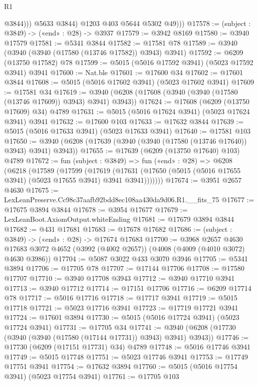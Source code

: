 \begin{lexlean}{R1}
\begin{coremodule}
                  @3844)))
            @5633
            @3844)
          @1203
          @403
          @5644
          @5302
          @49)))
@17578 := (subject : @3849) -> («end» : @28) -> @3937
@17579 := @3942 @8169
@17580 := @3940 @17579
@17581 := @5341 @3844
@17582 := @17581 @78
@17589 := @3940 (@3940 (@3940 (@17580 (@13746 @17582)) @3943) @3941)
@17592 := @6209 (@13750 @17582) @78
@17599 := @5015 (@5016 @17592 @3941) (@5023 @17592 @3941) @3941
@17600 := Nat.ble
@17601 := @17600 @34
@17602 := @17601 @3844
@17608 := @5015 (@5016 @17602 @3941) (@5023 @17602 @3941)
@17609 := @17581 @34
@17619 := @3940 (@6208 (@17608 (@3940 (@3940 (@17580 (@13746 @17609)) @3943) @3941) @3943))
@17624 := @17608 (@6209 (@13750 @17609) @34) @4789
@17631 := @5015 (@5016 @17624 @3941) (@5023 @17624 @3941) @3941
@17632 := @17600 @103
@17633 := @17632 @3844
@17639 := @5015 (@5016 @17633 @3941) (@5023 @17633 @3941)
@17640 := @17581 @103
@17650 := @3940 (@6208 (@17639 (@3940 (@3940 (@17580 (@13746 @17640)) @3943) @3941) @3943))
@17655 := @17639 (@6209 (@13750 @17640) @103) @4789
@17672 := fun (subject : @3849) =>
  fun («end» : @28) =>
  @6208
    (@6218
      (@17589
        (@17599
          (@17619
            (@17631 (@17650 (@5015 (@5016 @17655 @3941) (@5023 @17655 @3941) @3941 @3941)))))))
@17674 := @3951 @2657 @4630
@17675 := LexLeanPreserve.Cc98c37aafb92bdd8ec108aa430da9d06.R1.__fits_75
@17677 := @17675 @3894 @3844
@17678 := @3954 @17677
@17679 := LexLeanBoot.AxiomOutput.whiteEnding
@17681 := @17679 @3894 @3844
@17682 := @431 @17681
@17683 := @17678 @17682
@17686 := (subject : @3849) -> («end» : @28) -> @17674 @17683
@17700 := @3968
    @2657
    @4630
    @17683
    @3072
    @4652
    (@3992 (@4002 @2657))
    (@4008 (@4009 (@4010 @3072) @4630 @3986))
@17704 := @5087 @3022 @433 @3070 @3946
@17705 := @5341 @3894
@17706 := @17705 @78
@17707 := @17144 @17706
@17708 := @17580 @17707
@17710 := @3940 @17708 @3943
@17712 := @3940 @17710 @3941
@17713 := @3940 @17712
@17714 := @17151 @17706
@17716 := @6209 @17714 @78
@17717 := @5016 @17716
@17718 := @17717 @3941
@17719 := @5015 @17718
@17721 := @5023 @17716 @3941
@17723 := @17719 @17721 @3941
@17724 := @17601 @3894
@17730 := @5015 (@5016 @17724 @3941) (@5023 @17724 @3941)
@17731 := @17705 @34
@17741 := @3940 (@6208 (@17730 (@3940 (@3940 (@17580 (@17144 @17731)) @3943) @3941) @3943))
@17746 := @17730 (@6209 (@17151 @17731) @34) @4789
@17748 := @5016 @17746 @3941
@17749 := @5015 @17748
@17751 := @5023 @17746 @3941
@17753 := @17749 @17751 @3941
@17754 := @17632 @3894
@17760 := @5015 (@5016 @17754 @3941) (@5023 @17754 @3941)
@17761 := @17705 @103

\end{coremodule}
\end{lexlean}

